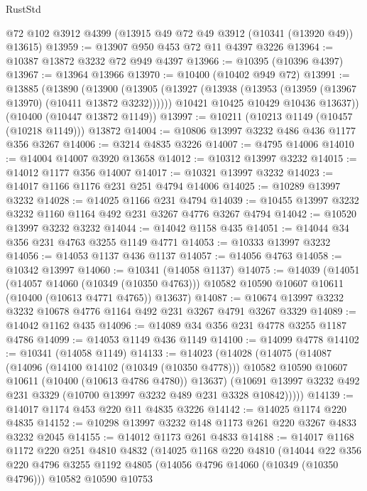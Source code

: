 \begin{lexlean}{RustStd}
\begin{coremodule}
    @72
    @102
    @3912
    @4399
    (@13915 @49 @72 @49 @3912 (@10341 (@13920 @49)) @13615)
@13959 := @13907 @950 @453 @72 @11 @4397 @3226
@13964 := @10387 @13872 @3232 @72 @949 @4397
@13966 := @10395 (@10396 @4397)
@13967 := @13964 @13966
@13970 := @10400 (@10402 @949 @72)
@13991 := @13885
    (@13890
      (@13900
        (@13905 (@13927 (@13938 (@13953 (@13959 (@13967 @13970) (@10411 @13872 @3232))))))
        @10421
        @10425
        @10429
        @10436
        @13637))
    (@10400 (@10447 @13872 @1149))
@13997 := @10211 (@10213 @1149 (@10457 (@10218 @1149))) @13872
@14004 := @10806 @13997 @3232 @486 @436 @1177 @356 @3267
@14006 := @3214 @4835 @3226
@14007 := @4795 @14006
@14010 := @14004 @14007 @3920 @13658
@14012 := @10312 @13997 @3232
@14015 := @14012 @1177 @356 @14007
@14017 := @10321 @13997 @3232
@14023 := @14017 @1166 @1176 @231 @251 @4794 @14006
@14025 := @10289 @13997 @3232
@14028 := @14025 @1166 @231 @4794
@14039 := @10455 @13997 @3232 @3232 @1160 @1164 @492 @231 @3267 @4776 @3267 @4794
@14042 := @10520 @13997 @3232 @3232
@14044 := @14042 @1158 @435
@14051 := @14044 @34 @356 @231 @4763 @3255 @1149 @4771
@14053 := @10333 @13997 @3232
@14056 := @14053 @1137 @436 @1137
@14057 := @14056 @4763
@14058 := @10342 @13997
@14060 := @10341 (@14058 @1137)
@14075 := @14039
    (@14051
      (@14057 @14060 (@10349 (@10350 @4763)))
      @10582
      @10590
      @10607
      @10611
      (@10400 (@10613 @4771 @4765))
      @13637)
@14087 := @10674 @13997 @3232 @3232 @10678 @4776 @1164 @492 @231 @3267 @4791 @3267 @3329
@14089 := @14042 @1162 @435
@14096 := @14089 @34 @356 @231 @4778 @3255 @1187 @4786
@14099 := @14053 @1149 @436 @1149
@14100 := @14099 @4778
@14102 := @10341 (@14058 @1149)
@14133 := @14023
    (@14028
      (@14075
        (@14087
          (@14096
            (@14100 @14102 (@10349 (@10350 @4778)))
            @10582
            @10590
            @10607
            @10611
            (@10400 (@10613 @4786 @4780))
            @13637)
          (@10691 @13997 @3232 @492 @231 @3329 (@10700 @13997 @3232 @489 @231 @3328 @10842)))))
@14139 := @14017 @1174 @453 @220 @11 @4835 @3226
@14142 := @14025 @1174 @220 @4835
@14152 := @10298 @13997 @3232 @148 @1173 @261 @220 @3267 @4833 @3232 @2045
@14155 := @14012 @1173 @261 @4833
@14188 := @14017
    @1168
    @1172
    @220
    @251
    @4810
    @4832
    (@14025
      @1168
      @220
      @4810
      (@14044
        @22
        @356
        @220
        @4796
        @3255
        @1192
        @4805
        (@14056 @4796 @14060 (@10349 (@10350 @4796)))
        @10582
        @10590
        @10753

\end{coremodule}
\end{lexlean}
